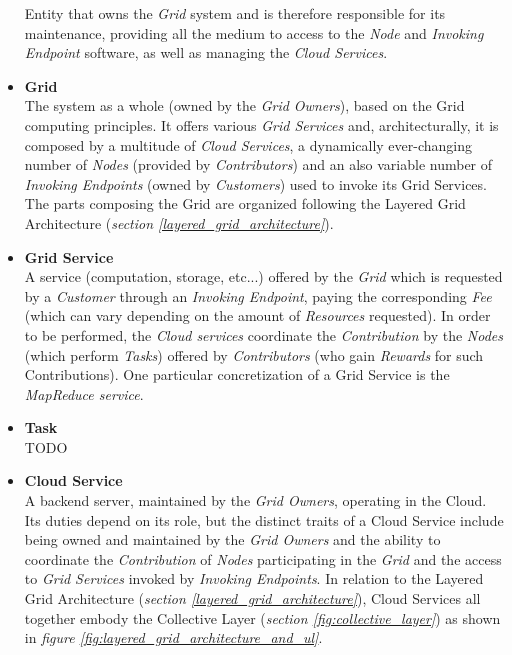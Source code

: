 \begin{itemize}
    Entity that owns the \textit{Grid} system and is therefore responsible for its maintenance, providing all the medium to access to the \textit{Node} and \textit{Invoking Endpoint} software, as well as managing the \textit{Cloud Services}.
    \item \textbf{Grid}\label{grid}\\
    The system as a whole (owned by the \textit{Grid Owners}), based on the Grid computing principles. It offers various \textit{Grid Services} and, architecturally, it is composed by a multitude of \textit{Cloud Services}, a dynamically ever-changing number of \textit{Nodes} (provided by \textit{Contributors}) and an also variable number of \textit{Invoking Endpoints} (owned by \textit{Customers}) used to invoke its Grid Services. The parts composing the Grid are organized following the Layered Grid Architecture (\textit{section \ref{layered_grid_architecture}}).
    \item \textbf{Grid Service}\label{grid_service}\\
    A service (computation, storage, etc...) offered by the \textit{Grid} which is requested by a \textit{Customer} through an \textit{Invoking Endpoint}, paying the corresponding \textit{Fee} (which can vary depending on the amount of \textit{Resources} requested). In order to be performed, the \textit{Cloud services} coordinate the \textit{Contribution} by the \textit{Nodes} (which perform \textit{Tasks}) offered by \textit{Contributors} (who gain \textit{Rewards} for such Contributions). One particular concretization of a Grid Service is the \textit{MapReduce service}.
    \item \textbf{Task}\label{task}\\
    TODO
    \item \textbf{Cloud Service}\label{cloud_service}\\
    A backend server, maintained by the \textit{Grid Owners}, operating in the Cloud. Its duties depend on its role, but the distinct traits of a Cloud Service include being owned and maintained by the \textit{Grid Owners} and the ability to coordinate the \textit{Contribution} of \textit{Nodes} participating in the \textit{Grid} and the access to \textit{Grid Services} invoked by \textit{Invoking Endpoints}. In relation to the Layered Grid Architecture (\textit{section \ref{layered_grid_architecture}}), Cloud Services all together embody the Collective Layer (\textit{section \ref{fig:collective_layer}}) as shown in \textit{figure \ref{fig:layered_grid_architecture_and_ul}}.
    \begin{figure}[!ht]

\end{figure}
\end{itemize}

